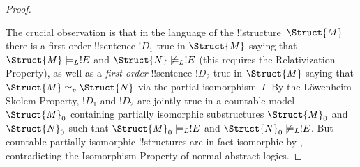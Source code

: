 \documentclass[../../include/open-logic-section]{subfiles}
\begin{document}
\begin{proof}
\begin{figure}[h]
  \centering
\end{figure}

The crucial observation is that in the language of the
!!{structure}~$\Struct{M}$ there is a first-order !!{sentence} $!D_1$
true in $\Struct{M}$ saying that $\Struct{M} \models_L !E$ and
$\Struct{N} \not\models_L !E$ (this requires the Relativization
Property), as well as a \emph{first-order} !!{sentence} $!D_2$ true in
$\Struct{M}$ saying that $\Struct{M} \simeq_p \Struct{N}$ via the
partial isomorphism~$I$. By the L\"owenheim-Skolem Property, $!D_1$
and $!D_2$ are jointly true in a countable model $\Struct{M}_0$
containing partially isomorphic substructures $\Struct{M}_0$ and
$\Struct{N}_0$ such that $\Struct{M}_0 \models_L !E$ and $\Struct{N}_0
\not\models_L !E$. But countable partially isomorphic !!{structure}s are
in fact isomorphic by , contradicting the
Isomorphism Property of normal abstract logics.
\end{proof}
\end{document}
